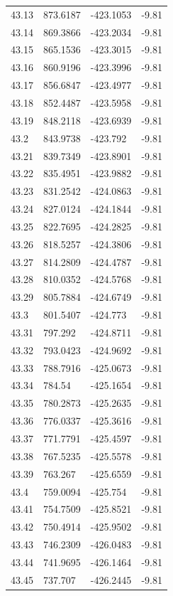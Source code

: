 \begin{table}[H]
\begin{tabular}{llll}
43.13 & 873.6187 & -423.1053 & -9.81 \\
43.14 & 869.3866 & -423.2034 & -9.81 \\
43.15 & 865.1536 & -423.3015 & -9.81 \\
43.16 & 860.9196 & -423.3996 & -9.81 \\
43.17 & 856.6847 & -423.4977 & -9.81 \\
43.18 & 852.4487 & -423.5958 & -9.81 \\
43.19 & 848.2118 & -423.6939 & -9.81 \\
43.2 & 843.9738 & -423.792 & -9.81 \\
43.21 & 839.7349 & -423.8901 & -9.81 \\
43.22 & 835.4951 & -423.9882 & -9.81 \\
43.23 & 831.2542 & -424.0863 & -9.81 \\
43.24 & 827.0124 & -424.1844 & -9.81 \\
43.25 & 822.7695 & -424.2825 & -9.81 \\
43.26 & 818.5257 & -424.3806 & -9.81 \\
43.27 & 814.2809 & -424.4787 & -9.81 \\
43.28 & 810.0352 & -424.5768 & -9.81 \\
43.29 & 805.7884 & -424.6749 & -9.81 \\
43.3 & 801.5407 & -424.773 & -9.81 \\
43.31 & 797.292 & -424.8711 & -9.81 \\
43.32 & 793.0423 & -424.9692 & -9.81 \\
43.33 & 788.7916 & -425.0673 & -9.81 \\
43.34 & 784.54 & -425.1654 & -9.81 \\
43.35 & 780.2873 & -425.2635 & -9.81 \\
43.36 & 776.0337 & -425.3616 & -9.81 \\
43.37 & 771.7791 & -425.4597 & -9.81 \\
43.38 & 767.5235 & -425.5578 & -9.81 \\
43.39 & 763.267 & -425.6559 & -9.81 \\
43.4 & 759.0094 & -425.754 & -9.81 \\
43.41 & 754.7509 & -425.8521 & -9.81 \\
43.42 & 750.4914 & -425.9502 & -9.81 \\
43.43 & 746.2309 & -426.0483 & -9.81 \\
43.44 & 741.9695 & -426.1464 & -9.81 \\
43.45 & 737.707 & -426.2445 & -9.81 \\

\end{tabular}
\end{table}
